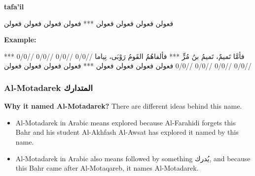 \textbf{tafa'il}

\begin{Arabic}
  \begin{traditionalpoem*}
    فعولن فعولن فعولن فعولن *** فعولن فعولن فعولن فعولن
    
     
	\end{traditionalpoem*}
      \end{Arabic}

\textbf{Example:}

\begin{Arabic}
  \begin{traditionalpoem*}

    فأمَّا تَميمٌ، تَميمُ بنُ مُرٍّ *** فألفاهُمُ القَومُ رَوْبَى، نِياما
    //0/0 //0/0 //0/0 //0/0 *** //0/0 //0/0 //0/0 //0/0
    فعولن فعولن فعولن فعولن *** فعولن فعولن فعولن فعولن
    

    
          
	\end{traditionalpoem*}
      \end{Arabic}

      

\subsubsection{Al-Motadarek \textarabic{المتدارك}}
\textbf{Why it named Al-Motadarek?}
There are different ideas behind this name.
\begin{itemize}
  \item Al-Motadarek in Arabic means explored because Al-Farahidi forgets this Bahr and his student Al-Akhfash Al-Awsat has explored it named by this name. 
\item Al-Motadarek in Arabic also means followed by something \textarabic{يُدرك}, and because this Bahr came after Al-Motaqareb, it names Al-Motadarek.
\end{itemize}


